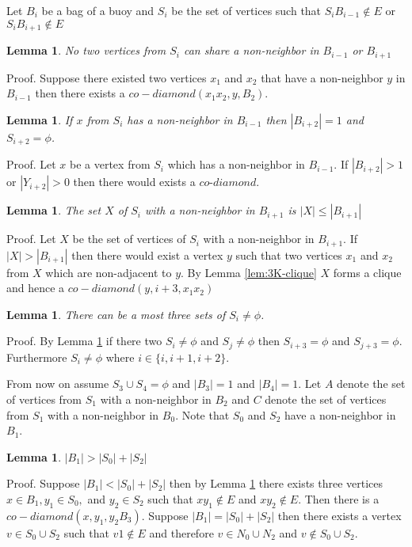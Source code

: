 \documentclass[12pt]{article}
\newtheorem{Lemma}[Theorem]{Lemma}
\begin{document}
Let $B_i$ be a bag of a buoy and $S_i$ be the set of vertices such that $S_iB_{i-1} \not \in E$ or $S_iB_{i+1} \not \in E$


\begin{Lemma}\label{lem:si-no-share-vertex}
No two vertices from $S_i$ can share a non-neighbor in $B_{i-1}$ or $B_{i+1}$
\end{Lemma}
\noindent {\it} Proof. Suppose there existed two vertices $x_1$ and $x_2$ that have a non-neighbor $y$ in $B_{i-1}$ then there exists a $co-diamond (x_1x_2, y, B_2)$.

\begin{Lemma}\label{lem:3-si-limit}
If $x$ from $S_i$ has a non-neighbor in $B_{i-1}$ then $|B_{i+2}| = 1$ and $S_{i+2} = \phi$.  
\end{Lemma}
\noindent {\it} Proof. Let $x$ be a vertex from $S_i$ which has a non-neighbor in $B_{i-1}$. If $|B_{i+2}| > 1$ or  $|Y_{i+2}| > 0$  then there would exists a $co$-$diamond$.

\begin{Lemma}\label{lem:si-limit}
The set $X$ of $S_i$ with a non-neighbor in $B_{i+1}$ is $|X| \leq |B_{i+1}|$ 
\end{Lemma}
\noindent {\it} Proof. Let $X$ be the set of vertices of $S_i$ with a non-neighbor in $B_{i+1}$. If $|X| > |B_{i+1}|$ then there would exist a vertex $y$ such that two vertices $x_1$ and $x_2$ from $X$ which are non-adjacent to $y$. By Lemma \ref{lem:3K-clique} $X$ forms a clique and hence a $co-diamond (y, i+3, x_1x_2)$

\begin{Lemma}\label{lem:max-3-si}
There can be a most three sets of $S_i \neq \phi$. 
\end{Lemma}
\noindent {\it} Proof. By Lemma \ref{lem:3-si-limit} if there two $S_i \neq \phi$ and $S_j \neq \phi$ then  $S_{i+3} = \phi$ and $S_{j+3} = \phi$. Furthermore $S_i \neq \phi$ where $i \in \{i, i+1, i+2\}$. 

From now on assume $S_3 \cup S_4 = \phi$ and $|B_3| = 1$ and $|B_4| = 1$. Let $A$ denote the set of vertices from $S_1$ with a non-neighbor in $B_2$ and $C$ denote the set of vertices from $S_1$ with a non-neighbor in $B_0$. Note that $S_0$ and $S_2$ have a non-neighbor in $B_1$.

\begin{Lemma}\label{lem:max-s0-s2}
$|B_1| > |S_0| + |S_2|$
\end{Lemma}
\noindent {\it} Proof. Suppose $|B_1| < |S_0| + |S_2|$ then by Lemma \ref{lem:si-no-share-vertex} there exists three vertices $x \in B_1, y_1 \in S_0,$ and $y_2 \in S_2$ such that $xy_1 \not \in E$ and $xy_2 \not \in E$. Then there is a $co-diamond (x, y_1, y_2B_3)$. Suppose $|B_1| = |S_0| + |S_2|$ then there exists a vertex $v \in S_0 \cup S_2$ such that $v1 \not \in E$ and therefore $v \in N_0 \cup N_2$ and $v \not \in S_0 \cup S_2$.
\end{document}
